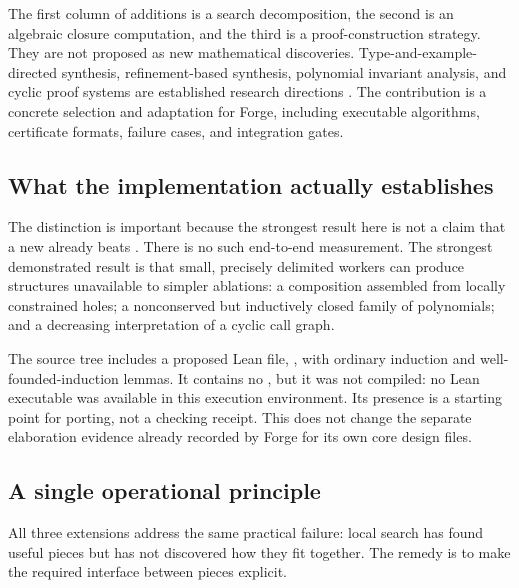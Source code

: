 The first column of additions is a search decomposition, the second is an
algebraic closure computation, and the third is a proof-construction strategy.
They are not proposed as new mathematical discoveries. Type-and-example-directed
synthesis, refinement-based synthesis, polynomial invariant analysis, and cyclic
proof systems are established research directions \cite{osera,polikarpova,karr,rodriguez,cycleq}.
The contribution is a concrete selection and adaptation for Forge, including
executable algorithms, certificate formats, failure cases, and integration gates.

\subsection{What the implementation actually establishes}


The distinction is important because the strongest result here is not a claim
that a new \forge{} already beats \grind{}. There is no such end-to-end measurement.
The strongest demonstrated result is that small, precisely delimited workers can
produce structures unavailable to simpler ablations: a composition assembled from
locally constrained holes; a nonconserved but inductively closed family of
polynomials; and a decreasing interpretation of a cyclic call graph.

The source tree includes a proposed Lean file, , with
ordinary induction and well-founded-induction lemmas. It contains no ,
but it was not compiled: no Lean executable was available in this execution
environment. Its presence is a starting point for porting, not a checking receipt.
This does not change the separate elaboration evidence already recorded by Forge
for its own core design files.

\subsection{A single operational principle}

All three extensions address the same practical failure: local search has found
useful pieces but has not discovered how they fit together. The remedy is to
make the required interface between pieces explicit.


